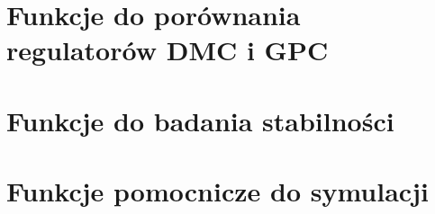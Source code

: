 \documentclass[a4paper,titlepage,11pt,floatssmall]{mwrep}
\begin{document}


\section{Funkcje do porównania regulatorów DMC i GPC}



\section{Funkcje do badania stabilności}





\section{Funkcje pomocnicze do symulacji}




\end{document}

